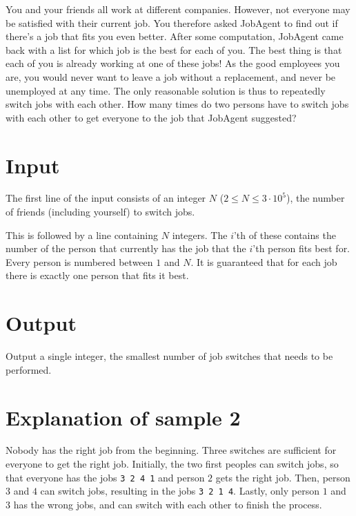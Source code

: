 You and your friends all work at different companies.
However, not everyone may be satisfied with their current job.
You therefore asked JobAgent to find out if there's a job that fits you even better.
After some computation, JobAgent came back with a list for which job is the best for each of you.
The best thing is that each of you is already working at one of these jobs!
As the good employees you are, you would never want to leave a job without a replacement, and never be unemployed at any time.
The only reasonable solution is thus to repeatedly switch jobs with each other.
How many times do two persons have to switch jobs with each other to get everyone to the job that JobAgent suggested?

\section*{Input}
The first line of the input consists of an integer $N$ ($2 \le N \le 3\cdot10^5$), the number of friends (including yourself) to switch jobs.

This is followed by a line containing $N$ integers.
The $i$'th of these contains the number of the person that currently has the job that the $i$'th person fits best for.
Every person is numbered between $1$ and $N$.
It is guaranteed that for each job there is exactly one person that fits it best.

\section*{Output}
Output a single integer, the smallest number of job switches that needs to be performed.

\section*{Explanation of sample 2}
Nobody has the right job from the beginning.
Three switches are sufficient for everyone to get the right job.
Initially, the two first peoples can switch jobs, so that everyone has the jobs \texttt{3 2 4 1} and person $2$ gets the right job.
Then, person $3$ and $4$ can switch jobs, resulting in the jobs \texttt{3 2 1 4}.
Lastly, only person $1$ and $3$ has the wrong jobs, and can switch with each other to finish the process.
